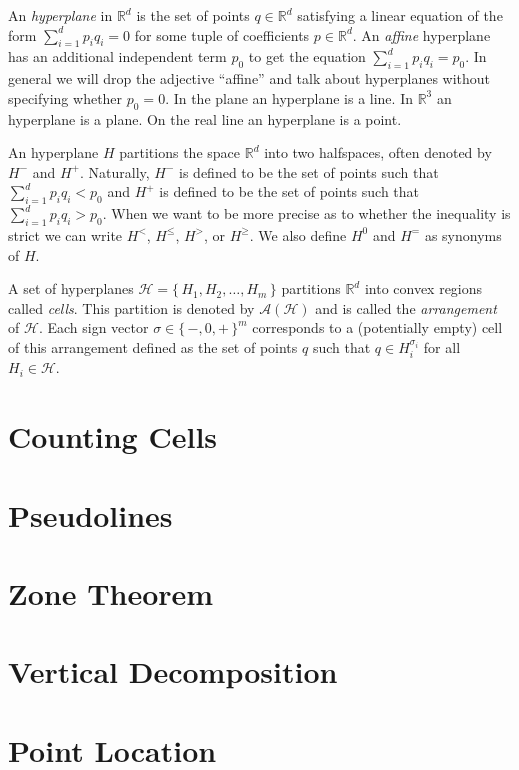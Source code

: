 An \emph{hyperplane} in \(\mathbb{R}^d\) is the set of points \(q \in \mathbb{R}^d\)
satisfying a linear equation of the form \(\sum_{i=1}^{d} p_i q_i = 0\) for
some tuple of coefficients \(p \in \mathbb{R}^d\). An \emph{affine} hyperplane has an
additional independent term \(p_0\) to get the equation \(\sum_{i=1}^{d}
p_i q_i = p_0\). In general we will drop the adjective ``affine'' and talk about
hyperplanes without specifying whether \(p_0 = 0\).
%
In the plane an hyperplane is a line. In \(\mathbb{R}^3\) an hyperplane is
a plane. On the real line an hyperplane is a point.

An hyperplane \(H\) partitions the space \(\mathbb{R}^d\) into two halfspaces,
often denoted by \(H^-\) and \(H^+\).
Naturally, \(H^-\) is defined to be the set of points such that
\(\sum_{i=1}^{d} p_i q_i < p_0 \) and \(H^+\) is defined to be the set of
points such that \(\sum_{i=1}^{d} p_i q_i > p_0 \). When we want to be more
precise as to whether the inequality is strict we can write \(H^{<}\),
\(H^{\leq}\), \(H^{>}\), or \(H^{\geq}\).
We also define \(H^0\) and \(H^{=}\) as synonyms of \(H\).

A set of hyperplanes \(\mathcal{H} = \{\, H_1, H_2, \ldots, H_m\,\}\)
partitions \(\mathbb{R}^d\) into convex regions called \emph{cells}.
%
This partition is denoted by \(\mathcal{A}(\mathcal{H})\) and is called the
\emph{arrangement} of \(\mathcal{H}\).
%
Each sign vector \(\sigma \in {\{\,-,0,+\,\}}^{m}\) corresponds to a
(potentially empty) cell of this arrangement defined as the set of points \(q\)
such that \(q \in H_i^{\sigma_i}\) for all \(H_i \in \mathcal{H}\).

\section{Counting Cells}


\section{Pseudolines}


\section{Zone Theorem}





\section{Vertical Decomposition}


\section{Point Location}

